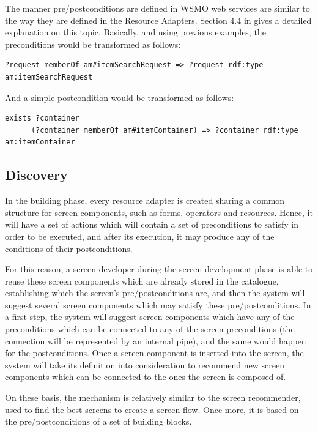 \documentclass{fast_latex}
\begin{document}
The manner pre/postconditions are defined in WSMO web services are similar to the way they are defined in the Resource Adapters. Section 4.4 in \cite{moller2010fast_ontology} gives a detailed explanation on this topic. Basically, and using previous examples, the preconditions would be transformed as follows:

\begin{verbatim}
?request memberOf am#itemSearchRequest => ?request rdf:type am:itemSearchRequest
\end{verbatim}

And a simple postcondition would be transformed as follows:

\begin{verbatim}
exists ?container 
      (?container memberOf am#itemContainer) => ?container rdf:type am:itemContainer
\end{verbatim}

      

\subsection{Discovery} %
\label{sub:discovery}

In the building phase, every resource adapter is created sharing a common structure for screen components, such as forms, operators and resources. Hence, it will have a set of actions which will contain a set of preconditions to satisfy in order to be executed, and after its execution, it may produce any of the conditions of their postconditions.

For this reason, a screen developer during the screen development phase is able to reuse these screen components which are already stored in the catalogue, establishing which the screen's pre/postconditions are, and then the system will suggest several screen components which may satisfy these pre/postconditions. In a first step, the system will suggest screen components which have any of the preconditions which can be connected to any of the screen preconditions (the connection will be represented by an internal pipe), and the same would happen for the postconditions. Once a screen component is inserted into the screen, the system will take its definition into consideration to recommend new screen components which can be connected to the ones the screen is composed of.

On these basis, the mechanism is relatively similar to the screen recommender, used to find the best screens to create a screen flow. Once more, it is based on the pre/postconditions of a set of building blocks.
\end{document}
